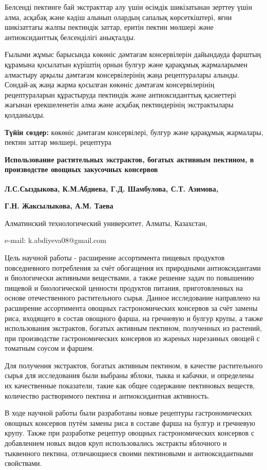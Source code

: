 Белсенді пектинге бай экстракттар алу үшін өсімдік шикізатынан зерттеу
үшін алма, асқабақ және кәдіш алынып олардың сапалық көрсеткіштері, яғни
шикізаттағы жалпы пектиндік заттар, еритін пектин мөлшері және
антиоксиданттық белсенділігі анықталды.

Ғылыми жұмыс барысында көкөніс дәмтағам консервілерін дайындауда фарштың
құрамына қосылатын күріштің орнын булгур және қарақұмық жармаларымен
алмастыру арқылы дәмтағам консервілерінің жаңа рецептуралары алынды.
Сондай-ақ жаңа жарма қосылған көкөніс дәмтағам консервілерінің
рецептураларын құрастыруда пектиндік және антиоксиданттық қасиеттері
жағынан ерекшеленетін алма және асқабақ пектиндерінің экстрактылары
қолданылды.

{\bfseries Түйін сөздер:} көкөніс дәмтағам консервілері, булгур және
қарақұмық жармалары, пектин заттар мөлшері, рецептура

{\bfseries Использование растительных экстрактов, богатых активным
пектином, в производстве овощных закусочных консервов}

{\bfseries Л.С.Сыздыкова, К.М.Абдиева\textsuperscript{\envelope }, Г.Д. Шамбулова,
С.Т. Азимова,}

{\bfseries Г.Н. Жаксылыкова, А.М. Таева}

Алматинский технологический университет, Алматы, Казахстан,

e-mail: k.abdiyeva08@gmail.com

Цель научной работы - расширение ассортимента пищевых продуктов
повседневного потребления за счёт обогащения их природными
антиоксидантами и биологически активными веществами, а также решение
задач по повышению пищевой и биологической ценности продуктов питания,
приготовленных на основе отечественного растительного сырья. Данное
исследование направлено на расширение ассортимента овощных
гастрономических консервов за счёт замены риса, входящего в состав
овощного фарша, на гречневую и булгур крупы, а также использования
экстрактов, богатых активным пектином, полученных из растений, при
производстве гастрономических консервов из жареных нарезанных овощей с
томатным соусом и фаршем.

Для получения экстрактов, богатых активным пектином, в качестве
растительного сырья для исследования были выбраны яблоки, тыква и
кабачки, и определены их качественные показатели, такие как общее
содержание пектиновых веществ, количество растворимого пектина и
антиоксидантная активность.

В ходе научной работы были разработаны новые рецептуры гастрономических
овощных консервов путём замены риса в составе фарша на булгур и
гречневую крупу. Также при разработке рецептур овощных гастрономических
консервов с добавлением новых видов круп использовались экстракты
яблочного и тыквенного пектина, отличающиеся своими пектиновыми и
антиоксидантными свойствами.

